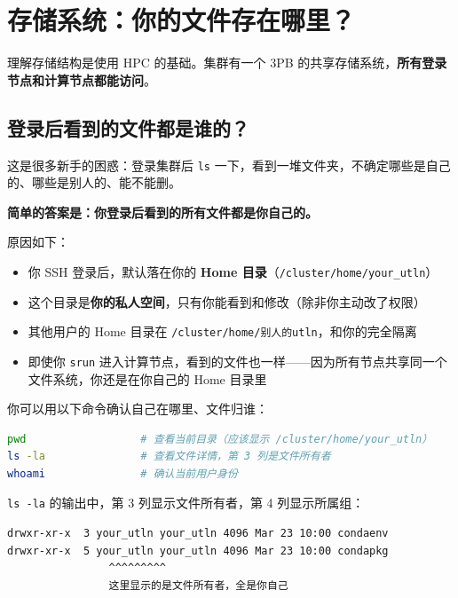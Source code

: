 \section{存储系统：你的文件存在哪里？}

理解存储结构是使用 HPC 的基础。集群有一个 3PB 的共享存储系统，\textbf{所有登录节点和计算节点都能访问}。

\subsection{登录后看到的文件都是谁的？}

这是很多新手的困惑：登录集群后 \texttt{ls} 一下，看到一堆文件夹，不确定哪些是自己的、哪些是别人的、能不能删。

\textbf{简单的答案是：你登录后看到的所有文件都是你自己的。}

原因如下：
\begin{itemize}[nosep]
  \item 你 SSH 登录后，默认落在你的 \textbf{Home 目录}（\texttt{/cluster/home/your\_utln}）
  \item 这个目录是\textbf{你的私人空间}，只有你能看到和修改（除非你主动改了权限）
  \item 其他用户的 Home 目录在 \texttt{/cluster/home/别人的utln}，和你的完全隔离
  \item 即使你 \texttt{srun} 进入计算节点，看到的文件也一样——因为所有节点共享同一个文件系统，你还是在你自己的 Home 目录里
\end{itemize}

你可以用以下命令确认自己在哪里、文件归谁：

\begin{lstlisting}[language=bash]
pwd                  # 查看当前目录（应该显示 /cluster/home/your_utln）
ls -la               # 查看文件详情，第 3 列是文件所有者
whoami               # 确认当前用户身份
\end{lstlisting}

\texttt{ls -la} 的输出中，第 3 列显示文件所有者，第 4 列显示所属组：

\begin{lstlisting}
drwxr-xr-x  3 your_utln your_utln 4096 Mar 23 10:00 condaenv
drwxr-xr-x  5 your_utln your_utln 4096 Mar 23 10:00 condapkg
                ^^^^^^^^^
                这里显示的是文件所有者，全是你自己
\end{lstlisting}

